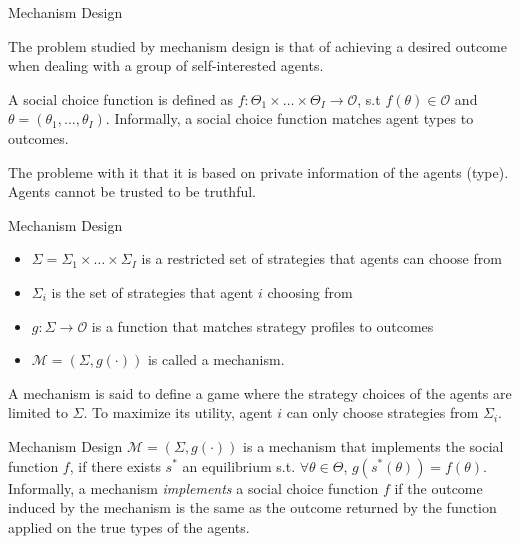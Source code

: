 \documentclass{beamer}
\begin{document}
\begin{frame}{Mechanism Design}
    \pause

    The problem studied by mechanism design is that of achieving a desired
    outcome when dealing with a group of self-interested agents.\pause
    \vspace{5mm}

    A social choice function is defined as $f:\Theta_1 \times \dots \times \Theta_I \rightarrow \mathcal{O}$, s.t $f(\theta) \in \mathcal{O}$ and $\theta=(\theta_1,\dots,\theta_I)$.
    Informally, a social choice function matches agent types to outcomes.\pause

    \vspace{5mm}

    The probleme with it that it is based on private information of the agents
    (type). Agents cannot be trusted to be truthful.
\end{frame}

\begin{frame}{Mechanism Design}
\begin{itemize}
    \pause
    \item $\Sigma=\Sigma_1 \times \dots \times \Sigma_I$ is a restricted set of strategies that agents can choose from \pause
    \item $\Sigma_i$ is the set of strategies that agent $i$ choosing from\pause
    \item $g:\Sigma\rightarrow\mathcal{O}$ is a function that matches strategy
        profiles to outcomes\pause
    \item $\mathcal{M}=(\Sigma,g(\cdot))$ is called a mechanism.\pause
\end{itemize}

A mechanism is said to define a game where the strategy choices
of the agents are limited to $\Sigma$. To maximize its utility,
agent $i$ can only choose strategies from $\Sigma_i$.

\end{frame}

\begin{frame}{Mechanism Design}
    \pause
    $\mathcal{M}=(\Sigma, g(\cdot))$ is a mechanism
    that implements the social function $f$, if there exists $s^*$ an
    equilibrium s.t. $\forall \theta\in\Theta$, $g(s^*(\theta))=f(\theta)$.\pause 
    \vspace{3mm}
    Informally, a mechanism \emph{implements} a social choice function $f$ if
    the outcome induced by the mechanism is the same as the outcome returned by
    the function applied on the true types of the agents.

\end{frame}
\end{document}
